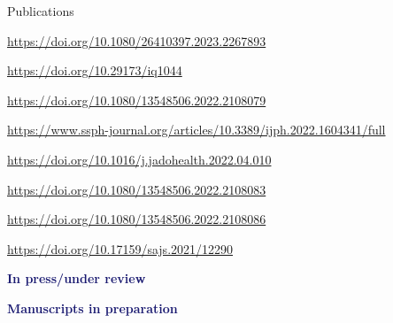 \begin{rSection}{Publications}

\begin{etaremune}
\item {} \url{https://doi.org/10.1080/26410397.2023.2267893}
\item {} \url{https://doi.org/10.29173/iq1044}
\item {} \url{https://doi.org/10.1080/13548506.2022.2108079}
\item {} \url{https://www.ssph-journal.org/articles/10.3389/ijph.2022.1604341/full}
\item {} \url{https://doi.org/10.1016/j.jadohealth.2022.04.010}
\item {} \url{https://doi.org/10.1080/13548506.2022.2108083}
\item {} \url{https://doi.org/10.1080/13548506.2022.2108086}
\item {} \url{https://doi.org/10.17159/sajs.2021/12290}
\end{etaremune}

\vspace{1em}
\textcolor{MidnightBlue}{\textbf{In press/under review}}
\vspace{1em}

\begin{etaremune}
\item {}
\item {}
\item {}
\item {}
\end{etaremune}

\vspace{1em}
\textcolor{MidnightBlue}{\textbf{Manuscripts in preparation}}
\vspace{1em}

\begin{etaremune}
\item {}
\item {}
\item {}
\item {}
\end{etaremune}


\end{rSection}
